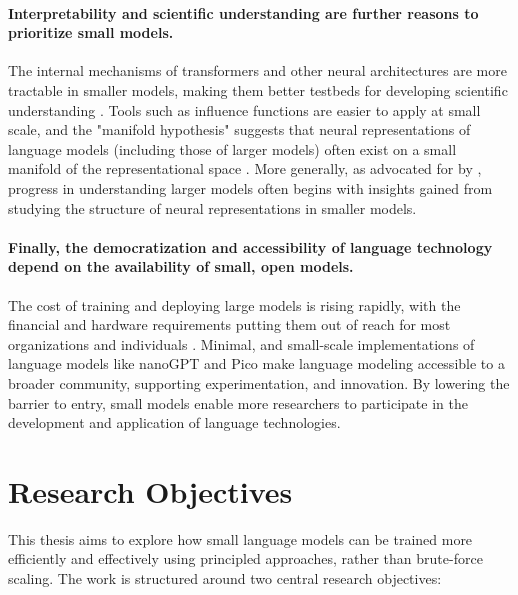 \paragraph{Interpretability and scientific understanding are further reasons to prioritize small models.} The internal mechanisms of transformers and other neural architectures are more tractable in smaller models, making them better testbeds for developing scientific understanding \citep{elhage2021mathematical, elhage2022toy, bircken2023monosemanticity, anthropic2023components}. Tools such as influence functions are easier to apply at small scale, and the "manifold hypothesis" suggests that neural representations of language models (including those of larger models) often exist on a small manifold of the representational space \citep{olah2014manifolds}. More generally, as advocated for by \citet{elhage2021mathematical}, progress in understanding larger models often begins with insights gained from studying the structure of neural representations in smaller models.

\paragraph{Finally, the democratization and accessibility of language technology depend on the availability of small, open models.} The cost of training and deploying large models is rising rapidly, with the financial and hardware requirements putting them out of reach for most organizations and individuals \citep{cottier2024rising, sharir2020cost}. Minimal, and small-scale implementations of language models like nanoGPT \citep{karpathy2023nanogpt} and Pico \citep{diehlmartinez2025pico} make language modeling accessible to a broader community, supporting experimentation, and innovation. By lowering the barrier to entry, small models enable more researchers to participate in the development and application of language technologies.


\section*{Research Objectives}

This thesis aims to explore how small language models can be trained more efficiently and effectively using principled approaches, rather than brute-force scaling. The work is structured around two central research objectives:


